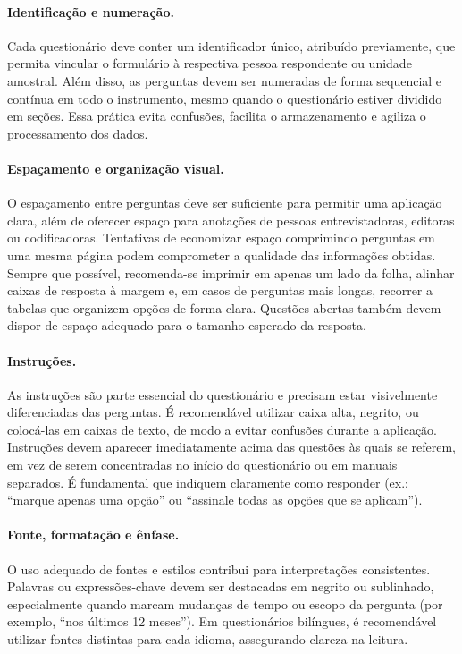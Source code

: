 \documentclass[12pt, a4paper, openany]{book}
\begin{document}
\paragraph{Identifica\c{c}\~ao e numera\c{c}\~ao.} Cada question\'ario deve conter um identificador \'unico, atribu\'ido previamente, que permita vincular o formul\'ario \`a respectiva pessoa respondente ou unidade amostral. Al\'em disso, as perguntas devem ser numeradas de forma sequencial e cont\'inua em todo o instrumento, mesmo quando o question\'ario estiver dividido em se\c{c}\~oes. Essa pr\'atica evita confus\~oes, facilita o armazenamento e agiliza o processamento dos dados.

\paragraph{Espa\c{c}amento e organiza\c{c}\~ao visual.} O espa\c{c}amento entre perguntas deve ser suficiente para permitir uma aplica\c{c}\~ao clara, al\'em de oferecer espa\c{c}o para anota\c{c}\~oes de pessoas entrevistadoras, editoras ou codificadoras. Tentativas de economizar espa\c{c}o comprimindo perguntas em uma mesma p\'agina podem comprometer a qualidade das informa\c{c}\~oes obtidas. Sempre que poss\'ivel, recomenda-se imprimir em apenas um lado da folha, alinhar caixas de resposta \`a margem e, em casos de perguntas mais longas, recorrer a tabelas que organizem op\c{c}\~oes de forma clara. Quest\~oes abertas tamb\'em devem dispor de espa\c{c}o adequado para o tamanho esperado da resposta.

\paragraph{Instru\c{c}\~oes.} As instru\c{c}\~oes s\~ao parte essencial do question\'ario e precisam estar visivelmente diferenciadas das perguntas. \'E recomend\'avel utilizar caixa alta, negrito, ou coloc\'a-las em caixas de texto, de modo a evitar confus\~oes durante a aplica\c{c}\~ao. Instru\c{c}\~oes devem aparecer imediatamente acima das quest\~oes \`as quais se referem, em vez de serem concentradas no in\'icio do question\'ario ou em manuais separados. \'E fundamental que indiquem claramente como responder (ex.: ``marque apenas uma op\c{c}\~ao'' ou ``assinale todas as op\c{c}\~oes que se aplicam'').

\paragraph{Fonte, formata\c{c}\~ao e \^enfase.} O uso adequado de fontes e estilos contribui para interpreta\c{c}\~oes consistentes. Palavras ou express\~oes-chave devem ser destacadas em negrito ou sublinhado, especialmente quando marcam mudan\c{c}as de tempo ou escopo da pergunta (por exemplo, ``nos \'ultimos 12 meses''). Em question\'arios bil\'ingues, \'e recomend\'avel utilizar fontes distintas para cada idioma, assegurando clareza na leitura.
\end{document}
